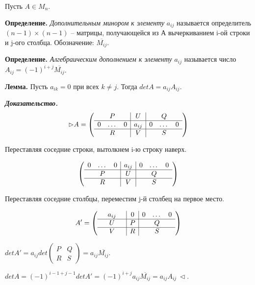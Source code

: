 \vspace{\baselineskip}
Пусть $A \in M_n$.

\textbf{Определение.} \textit{Дополнительным минором к элементу} $a_{ij}$ называется определитель $(n-1) \times (n-1)$ -- матрицы, получающейся из А вычеркиванием i-ой строки и j-ого столбца. Обозначение: $\overline{M_{ij}}$.

\vspace{\baselineskip}
\textbf{Определение.} \textit{Алгебраическим дополнением к элементу} $a_{ij}$ называется число $A_{ij} = (-1)^{i+j} \overline{M_{ij}}$.

\vspace{\baselineskip}
\textbf{Лемма.} Пусть $a_{ik} = 0$ при всех $k \neq j$. Тогда $detA = a_{ij}A_{ij}$.

\textbf{\textit{Доказательство.}}
\[ \rhd A = 
\left(
\begin{array}{ccc|c|ccc}
  & P & & U & & Q & \\
  \hline
  0 & \dots & 0 & a_{ij} & 0 & \dots & 0 \\
  \hline
  & R & & V & & S &
\end{array}
\right)
\]

\vspace{\baselineskip}
Переставляя соседние строки, вытолкнем i-ю строку наверх.

\[ 
\left(
\begin{array}{ccc|c|ccc}
	0 & \dots & 0 & a_{ij} & 0 & \dots & 0 \\
  \hline
  & P & & U & & Q & \\
  \hline
  & R & & V & & S &
\end{array}
\right)
\]

\vspace{\baselineskip}
Переставляя соседние столбцы, переместим j-й столбец на первое место. 

\[ A' = 
\left(
\begin{array}{ccc|c|ccc}
	 & a_{ij} &  & 0  & 0 & \dots & 0 \\
  \hline
  & U & & P & & Q & \\
  \hline
  & V & & R & & S &
\end{array}
\right)
\]

\vspace{\baselineskip}
$detA' = a_{ij}det \left(
\begin{array}{c|c}
  P & Q \\
  \hline
  R & S
\end{array}
\right) = a_{ij} \overline{M_{ij}}$.

\vspace{\baselineskip}
$det A = (-1)^{i-1+j-1} det A' = (-1)^{i+j} a_{ij}\overline{M_{ij}} = a_{ij} A_{ij} \ \lhd$.

